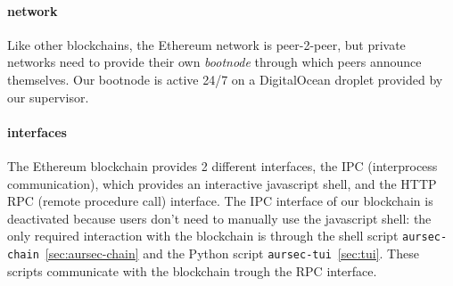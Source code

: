 \paragraph*{network}
Like other blockchains, the Ethereum network is peer-2-peer, but private networks need to provide their own \emph{bootnode} through which peers announce themselves. Our bootnode is active 24/7 on a DigitalOcean droplet provided by our supervisor.

\paragraph*{interfaces}
The Ethereum blockchain provides 2 different interfaces, the IPC (interprocess communication), which provides an interactive javascript shell, and the HTTP RPC (remote procedure call) interface. The IPC interface of our blockchain is deactivated because users don't need to manually use the javascript shell: the only required interaction with the blockchain is through the shell script \texttt{aursec-chain}~\ref{sec:aursec-chain} and the Python script \texttt{aursec-tui}~\ref{sec:tui}. These scripts communicate with the blockchain trough the RPC interface.